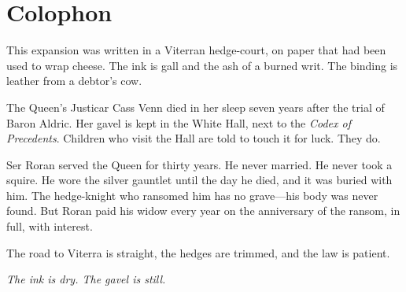 \documentclass[11pt,twoside]{book}
\newcommand{\ornament}{\par\centering\adforn{36}\par}
\begin{document}
\ornament

\chapter{Colophon}

This expansion was written in a Viterran hedge-court, on paper that had been used to wrap cheese. The ink is gall and the ash of a burned writ. The binding is leather from a debtor's cow.

The Queen's Justicar Cass Venn died in her sleep seven years after the trial of Baron Aldric. Her gavel is kept in the White Hall, next to the \textit{Codex of Precedents}. Children who visit the Hall are told to touch it for luck. They do.

Ser Roran served the Queen for thirty years. He never married. He never took a squire. He wore the silver gauntlet until the day he died, and it was buried with him. The hedge-knight who ransomed him has no grave---his body was never found. But Roran paid his widow every year on the anniversary of the ransom, in full, with interest.

The road to Viterra is straight, the hedges are trimmed, and the law is patient.

\begin{center}
\vspace{2em}
\textit{The ink is dry. The gavel is still.}
\end{center}
\end{document}
